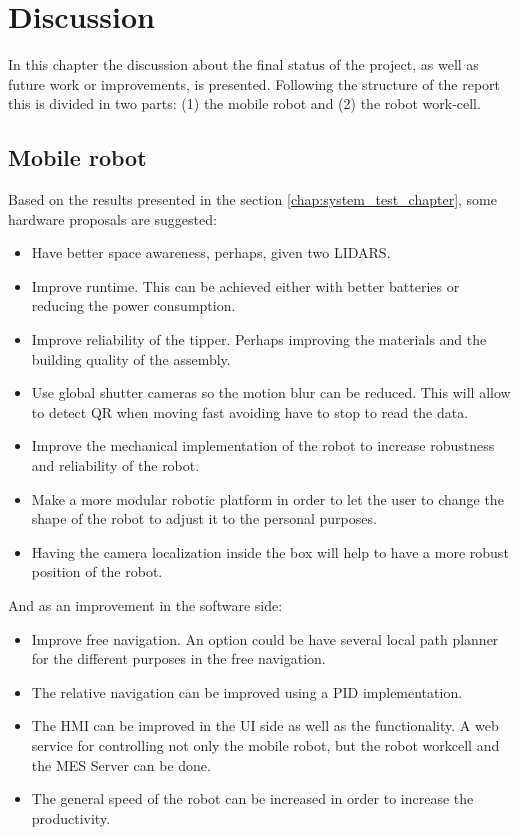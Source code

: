 \chapter{Discussion}
\label{chap:discussion}
In this chapter the discussion about the final status of the project, as well as future work or improvements, is presented.
Following the structure of the report this is divided in two parts: (1) the mobile robot and (2) the robot work-cell.

	\section{Mobile robot} %
	\label{sub:mobile_robot}
	Based on the results presented in the section \ref{chap:system_test_chapter}, some hardware proposals are suggested:
	\begin{itemize}
		\item Have better space awareness, perhaps, given two LIDARS.
		\item Improve runtime. This can be achieved either with better batteries or reducing the power consumption.
		\item Improve reliability of the tipper. Perhaps improving the materials and the building quality of the assembly.
		\item Use global shutter cameras so the motion blur can be reduced. This will allow to detect QR when moving fast avoiding have to stop to read the data.
		\item Improve the mechanical implementation of the robot to increase robustness and reliability of the robot.
		\item Make a more modular robotic platform in order to let the user to change the shape of the robot to adjust it to the personal purposes.
		\item Having the camera localization inside the box will help to have a more robust position of the robot.
	\end{itemize}
	And as an improvement in the software side:
	\begin{itemize}
		\item Improve free navigation. An option could be have several local path planner for the different purposes in the free navigation.
		\item The relative navigation can be improved using a PID implementation.
		\item The HMI can be improved in the UI side as well as the functionality. A web service for controlling not only the mobile robot, but the robot workcell and the MES Server can be done.
		\item The general speed of the robot can be increased in order to increase the productivity.
	\end{itemize}

